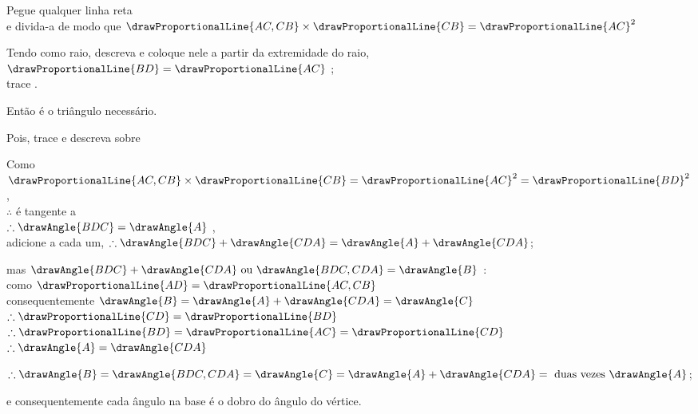 \documentclass[booklanguage=brazilian]{byrnebook}
\begin{document}
\begin{center}
Pegue qualquer linha reta  \\
e divida-a de modo que $\drawProportionalLine{AC,CB} \times \drawProportionalLine{CB} = \drawProportionalLine{AC}^2$ 

Tendo  como raio, descreva  e coloque nele a partir da extremidade do raio, $\drawProportionalLine{BD} = \drawProportionalLine{AC}$ ;\\
trace .

Então  é o triângulo necessário.

Pois, trace  e descreva  sobre  

Como $\drawProportionalLine{AC,CB} \times \drawProportionalLine{CB} = \drawProportionalLine{AC}^2 = \drawProportionalLine{BD}^2$,\\
$\therefore$  é tangente a \circleF\ \\
$\therefore \drawAngle{BDC} = \drawAngle{A}$ ,\\
adicione  a cada um, $\therefore \drawAngle{BDC} + \drawAngle{CDA} = \drawAngle{A} + \drawAngle{CDA}$;

mas $\drawAngle{BDC} + \drawAngle{CDA} \mbox{ ou } \drawAngle{BDC,CDA} = \drawAngle{B}$ :\\
como $\drawProportionalLine{AD} = \drawProportionalLine{AC,CB}$ \\
consequentemente $\drawAngle{B} = \drawAngle{A} + \drawAngle{CDA} = \drawAngle{C}$ \\
$\therefore \drawProportionalLine{CD} = \drawProportionalLine{BD}$ \\
$\therefore \drawProportionalLine{BD} = \drawProportionalLine{AC} = \drawProportionalLine{CD}$ \byref{\constref}\\
$\therefore \drawAngle{A} = \drawAngle{CDA}$ 

$\therefore \drawAngle{B} = \drawAngle{BDC,CDA} = \drawAngle{C} = \drawAngle{A} + \drawAngle{CDA} = \mbox{ duas vezes } \drawAngle{A}$;

e consequentemente cada ângulo na base é o dobro do ângulo do vértice.
\end{center}
\end{document}
